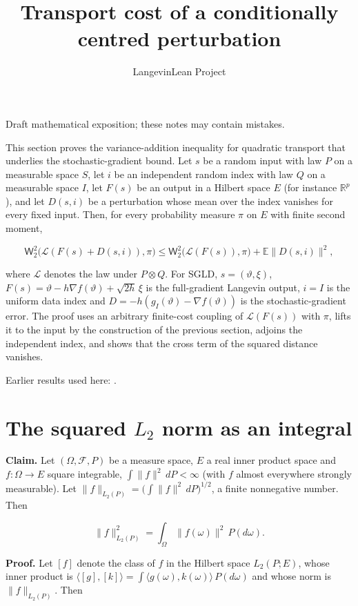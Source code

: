 \documentclass[11pt,a4paper]{article}
\title{\texorpdfstring{Transport cost of a conditionally centred perturbation}{Transport cost of a conditionally centred perturbation}}
\author{LangevinLean Project}
\date{}
\begin{document}
\maketitle
Draft mathematical exposition; these notes may contain mistakes.


This section proves the variance-addition inequality for quadratic transport that underlies the stochastic-gradient bound. Let \(s\) be a random input with law \(P\) on a measurable space \(S\), let \(i\) be an independent random index with law \(Q\) on a measurable space \(I\), let \(F(s)\) be an output in a Hilbert space \(E\) (for instance \(\mathbb R^p\)), and let \(D(s,i)\) be a perturbation whose mean over the index vanishes for every fixed input. Then, for every probability measure \(\pi\) on \(E\) with finite second moment,


\[\mathsf W_2^2\bigl(\mathcal L(F(s)+D(s,i)),\pi\bigr)\le\mathsf W_2^2\bigl(\mathcal L(F(s)),\pi\bigr)+\mathbb E\|D(s,i)\|^2,\]


where \(\mathcal L\) denotes the law under \(P\otimes Q\). For SGLD, \(s=(\vartheta,\xi)\), \(F(s)=\vartheta-h\nabla f(\vartheta)+\sqrt{2h}\,\xi\) is the full-gradient Langevin output, \(i=I\) is the uniform data index and \(D=-h(g_I(\vartheta)-\nabla f(\vartheta))\) is the stochastic-gradient error. The proof uses an arbitrary finite-cost coupling of \(\mathcal L(F(s))\) with \(\pi\), lifts it to the input by the construction of the previous section, adjoins the independent index, and shows that the cross term of the squared distance vanishes.



Earlier results used here: \cite[Section~3.21]{LangevinLean2026ULASC}.

\section{\texorpdfstring{The squared \(L_2\) norm as an integral}{The squared L₂ norm as an integral}}


\textbf{Claim.} Let \((\Omega,\mathcal F,P)\) be a measure space, \(E\) a real inner product space and \(f:\Omega\to E\) square integrable, \(\int\|f\|^2\,dP<\infty\) (with \(f\) almost everywhere strongly measurable). Let \(\|f\|_{L_2(P)}=\bigl(\int\|f\|^2\,dP\bigr)^{1/2}\), a finite nonnegative number. Then


\[\|f\|_{L_2(P)}^2=\int_\Omega\|f(\omega)\|^2\,P(d\omega).\]


\textbf{Proof.} Let \([f]\) denote the class of \(f\) in the Hilbert space \(L_2(P;E)\), whose inner product is \(\langle[g],[k]\rangle=\int\langle g(\omega),k(\omega)\rangle\,P(d\omega)\) and whose norm is \(\|f\|_{L_2(P)}\). Then
\end{document}
